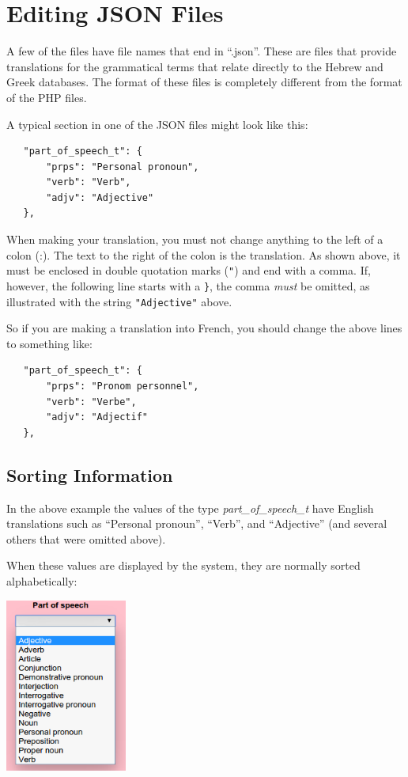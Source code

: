 \documentclass[11pt,oneside,a4paper]{memoir}
\begin{document}
\chapter{Editing JSON Files}

A few of the files have file names that end in ``.json''. These are files that provide translations
for the grammatical terms that relate directly to the Hebrew and Greek databases. The format of
these files is completely different from the format of the PHP files.

A typical section in one of the JSON files might look like this:

\begin{lstlisting}
   "part_of_speech_t": {
       "prps": "Personal pronoun",
       "verb": "Verb",
       "adjv": "Adjective"
   },
\end{lstlisting}

When making your translation, you must not change anything to the left of a colon (:). The
text to the right of the colon is the translation. As shown above, it must be enclosed in
double quotation marks (\verb|"|) and end with a comma. If, however, the following line starts with
a \verb|}|, the comma \emph{must} be omitted, as illustrated with the string \verb|"Adjective"| above.

So if you are making a translation into French, you should change the above lines to something like:

\begin{lstlisting}
   "part_of_speech_t": {
       "prps": "Pronom personnel",
       "verb": "Verbe",
       "adjv": "Adjectif"
   },
\end{lstlisting}

\section{Sorting Information}

In the above example the values of the type \emph{part\_of\_speech\_t} have English translations
such as ``Personal pronoun'', ``Verb'', and ``Adjective'' (and several others that were omitted above).

When these values are displayed by the system, they are normally sorted alphabetically:

\begin{center}
  \includegraphics[width=0.3\textwidth]{psp.png}
\end{center}
\end{document}
